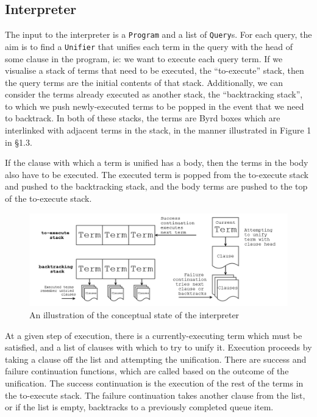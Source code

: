 \documentclass[12pt]{article}
\begin{document}
\subsection{Interpreter}

The input to the interpreter is a \verb|Program| and a list of \verb|Query|s. 
For each query, the aim is to find a \verb|Unifier| that unifies each term in the query with the head of some clause in the program, ie: we want to execute each query term. 
If we visualise a stack of terms that need to be executed, the ``to-execute'' stack, then the query terms are the initial contents of that stack. 
Additionally, we can consider the terms already executed as another stack, the ``backtracking stack'', to which we push newly-executed terms to be popped in the event that we need to backtrack.
In both of these stacks, the terms are Byrd boxes which are interlinked with adjacent terms in the stack, in the manner illustrated in Figure 1 in \S1.3.

If the clause with which a term is unified has a body, then the terms in the body also have to be executed.
The executed term is popped from the to-execute stack and pushed to the backtracking stack, and the body terms are pushed to the top of the to-execute stack.

\begin{figure}[H]
\includegraphics[scale=0.65]{interpreter.png}
\caption{An illustration of the conceptual state of the interpreter}
\end{figure}

At a given step of execution, there is a currently-executing term which must be satisfied, and a list of clauses with which to try to unify it. 
Execution proceeds by taking a clause off the list and attempting the unification. 
There are success and failure continuation functions, which are called based on the outcome of the unification.
The success continuation is the execution of the rest of the terms in the to-execute stack. The failure continuation takes another clause from the list, or if the list is empty, backtracks to a previously completed queue item.
\end{document}
